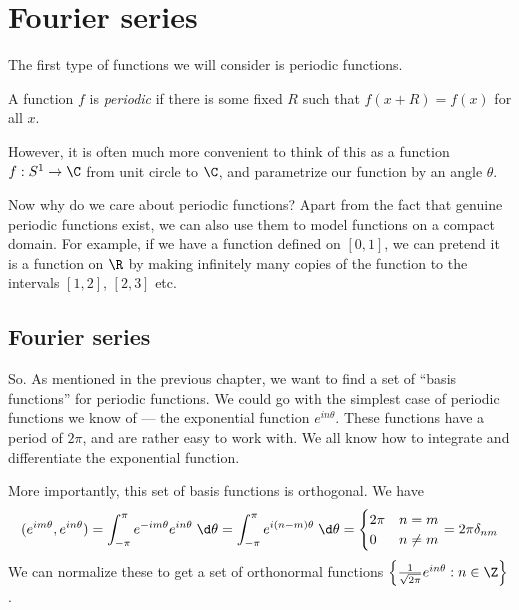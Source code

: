 \documentclass[a4paper]{article}
\begin{document}
\section{Fourier series}
The first type of functions we will consider is periodic functions.
\begin{defi}
  A function $f$ is \emph{periodic} if there is some fixed $R$ such that $f(x + R) = f(x)$ for all $x$.

  However, it is often much more convenient to think of this as a function $f: S^1 \to \C$ from unit circle to $\C$, and parametrize our function by an angle $\theta$.
\end{defi}
Now why do we care about periodic functions? Apart from the fact that genuine periodic functions exist, we can also use them to model functions on a compact domain. For example, if we have a function defined on $[0, 1]$, we can pretend it is a function on $\R$ by making infinitely many copies of the function to the intervals $[1, 2]$, $[2, 3]$ etc.
\begin{center}
\end{center}
\subsection{Fourier series}
So. As mentioned in the previous chapter, we want to find a set of ``basis functions'' for periodic functions. We could go with the simplest case of periodic functions we know of --- the exponential function $e^{in\theta}$. These functions have a period of $2\pi$, and are rather easy to work with. We all know how to integrate and differentiate the exponential function.

More importantly, this set of basis functions is orthogonal. We have
\[
  (e^{im \theta}, e^{in\theta}) = \int_{-\pi}^{\pi} e^{-im\theta} e^{in\theta}\;\d \theta = \int_{-\pi}^\pi e^{i(n - m)\theta}\;\d \theta =
  \begin{cases}
    2\pi & n = m\\
    0 & n\not= m
  \end{cases} = 2\pi \delta_{nm}
\]
We can normalize these to get a set of orthonormal functions $\left\{\frac{1}{\sqrt{2\pi}} e^{in\theta}: n\in \Z\right\}$.
\end{document}
